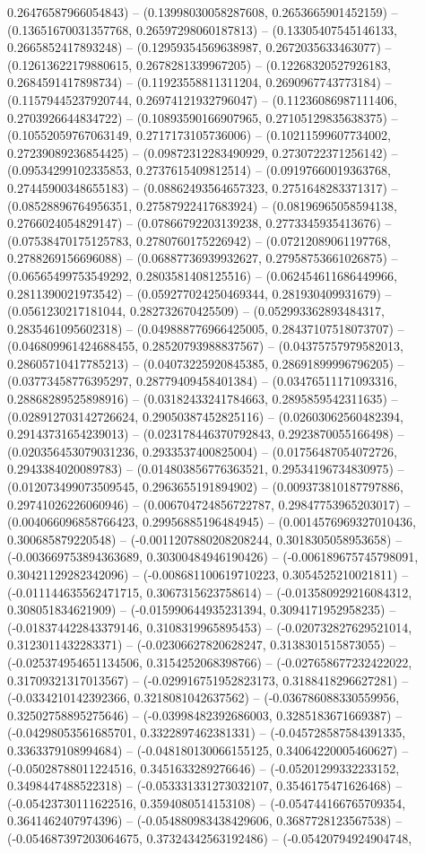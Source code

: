 0.26476587966054843) -- (0.13998030058287608, 0.2653665901452159) -- (0.13651670031357768, 0.26597298060187813) -- (0.13305407545146133, 0.2665852417893248) -- (0.12959354569638987, 0.2672035633463077) -- (0.12613622179880615, 0.2678281339967205) -- (0.12268320527926183, 0.2684591417898734) -- (0.11923558811311204, 0.2690967743773184) -- (0.11579445237920744, 0.26974121932796047) -- (0.11236086987111406, 0.2703926644834722) -- (0.10893590166907965, 0.27105129835638375) -- (0.10552059767063149, 0.2717173105736006) -- (0.10211599607734002, 0.27239089236854425) -- (0.09872312283490929, 0.2730722371256142) -- (0.09534299102335853, 0.2737615409812514) -- (0.09197660019363768, 0.27445900348655183) -- (0.08862493564657323, 0.2751648283371317) -- (0.08528896764956351, 0.27587922417683924) -- (0.08196965058594138, 0.2766024054829147) -- (0.07866792203139238, 0.2773345935413676) -- (0.07538470175125783, 0.2780760175226942) -- (0.07212089061197768, 0.2788269156696088) -- (0.06887736939932627, 0.27958753661026875) -- (0.06565499753549292, 0.2803581408125516) -- (0.062454611686449966, 0.2811390021973542) -- (0.059277024250469344, 0.281930409931679) -- (0.0561230217181044, 0.282732670425509) -- (0.052993362893484317, 0.2835461095602318) -- (0.049888776966425005, 0.28437107518073707) -- (0.046809961424688455, 0.28520793988837567) -- (0.04375757979582013, 0.28605710417785213) -- (0.04073225920845385, 0.28691899996796205) -- (0.03773458776395297, 0.28779409458401384) -- (0.03476511171093316, 0.28868289525898916) -- (0.03182433241784663, 0.2895859542311635) -- (0.028912703142726624, 0.29050387452825116) -- (0.02603062560482394, 0.29143731654239013) -- (0.023178446370792843, 0.2923870055166498) -- (0.020356453079031236, 0.2933537400825004) -- (0.01756487054072726, 0.2943384020089783) -- (0.014803856776363521, 0.29534196734830975) -- (0.012073499073509545, 0.2963655191894902) -- (0.009373810187797886, 0.29741026226060946) -- (0.006704724856722787, 0.29847753965203017) -- (0.004066096858766423, 0.29956885196484945) -- (0.0014576969327010436, 0.300685879220548) -- (-0.0011207880208208244, 0.3018305058953658) -- (-0.003669753894363689, 0.30300484946190426) -- (-0.006189675745798091, 0.30421129282342096) -- (-0.008681100619710223, 0.3054525210021811) -- (-0.011144635562471715, 0.3067315623758614) -- (-0.013580929216084312, 0.308051834621909) -- (-0.015990644935231394, 0.3094171952958235) -- (-0.018374422843379146, 0.3108319965895453) -- (-0.020732827629521014, 0.3123011432283371) -- (-0.02306627820628247, 0.3138301515873055) -- (-0.025374954651134506, 0.3154252068398766) -- (-0.027658677232422022, 0.31709321317013567) -- (-0.029916751952823173, 0.3188418296627281) -- (-0.0334210142392366, 0.3218081042637562) -- (-0.036786088330559956, 0.32502758895275646) -- (-0.03998482392686003, 0.3285183671669387) -- (-0.04298053561685701, 0.3322897462381331) -- (-0.045728587584391335, 0.3363379108994684) -- (-0.048180130066155125, 0.34064220005460627) -- (-0.05028788011224516, 0.3451633289276646) -- (-0.05201299332233152, 0.3498447488522318) -- (-0.053331331273032107, 0.3546175471626468) -- (-0.05423730111622516, 0.3594080514153108) -- (-0.054744166765709354, 0.3641462407974396) -- (-0.054880983438429606, 0.3687728123567538) -- (-0.054687397203064675, 0.37324342563192486) -- (-0.05420794924904748, 